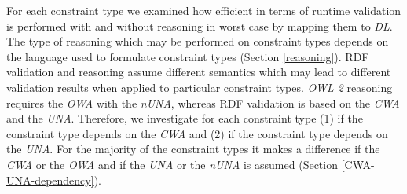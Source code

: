 \documentclass{acm_proc_article-sp}
\begin{document}
For each constraint type we examined how efficient in terms of runtime validation is performed with and without reasoning in worst case by mapping them to \emph{DL}.
The type of reasoning which may be performed on constraint types
depends on the language used to formulate constraint types (Section \ref{reasoning}).
RDF validation and reasoning assume different semantics which may lead to different validation results when applied to particular constraint types. %
\emph{OWL 2} reasoning requires the \emph{OWA} with the \emph{nUNA}, 
whereas RDF validation is based on the \emph{CWA} and the \emph{UNA}.
Therefore, we investigate for each constraint type
(1) if the constraint type depends on the \emph{CWA} and (2) if the constraint type depends on the \emph{UNA}.
For the majority of the constraint types it makes a difference if the \emph{CWA} or the \emph{OWA} and if the \emph{UNA} or the \emph{nUNA} is assumed (Section \ref{CWA-UNA-dependency}).
\end{document}
